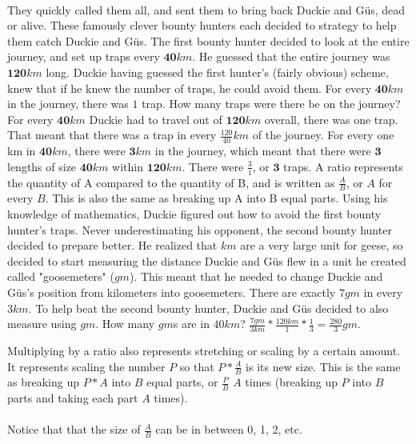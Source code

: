 \paragraph{} They quickly called them all, and sent them to bring back Duckie and Güs, dead or alive. These famously clever bounty hunters each decided to strategy to help them catch Duckie and Güs.
\vfill
\pagebreak
{The first bounty hunter decided to look at the entire journey, and set up traps every $\mathbf{40} km$. He guessed that the entire journey was $\mathbf{120} km$ long. Duckie having guessed the first hunter's (fairly obvious) scheme, knew that if he knew the number of traps, he could avoid them. For every $\mathbf{40}km$ in the journey, there was $1$ trap. How many traps were there be on the journey?}
{For every $\textbf{40} km$ Duckie had to travel out of $\textbf{120} km$ overall, there was one trap. That meant that there was a trap in every $\frac{120}{40} km$ of the journey. For every one km in $\textbf{40} km$, there were $\textbf{3} km$ in the journey, which meant that there were $\textbf{3}$ lengths of size $\textbf{40} km$ within $\textbf{120} km$. There were $\frac{3}{1}$, or $\textbf{3}$ traps.}
{A ratio represents the quantity of A compared to the quantity of B, and is written as $\frac{A}{B}$, or $A$ for every $B$. This is also the same as breaking up A into B equal parts.}
{}
{Using his knowledge of mathematics, Duckie figured out how to avoid the first bounty hunter's traps. Never underestimating his opponent, the second bounty hunter decided to prepare better. He realized that $km$ are a very large unit for geese, so decided to start measuring the distance Duckie and Güs flew in a unit he created called "goosemeters" ($gm$). This meant that he needed to change Duckie and Güs's position from kilometers into goosemeters. There are exactly $7 gm$ in every $3 km$. To help beat the second bounty hunter, Duckie and Güs decided to also measure using $gm$. How many $gm$s are in $40 km$?}
{$\frac{7 gm}{3 km}\ast\frac{120 km}{1}\ast\frac{1}{3}=\frac{280}{3} gm$.}
{Multiplying by a ratio also represents stretching or scaling by a certain amount. It represents scaling the number $P$ so that $P\ast\frac{A}{B}$ is its new size. This is the same as breaking up $P\ast A$ into $B$ equal parts, or $\frac{P}{B}$ $A$ times (breaking up $P$ into $B$ parts and taking each part $A$ times).\paragraph{} Notice that that the size of $\frac{A}{B}$ can be in between 0, 1, 2, etc.}
